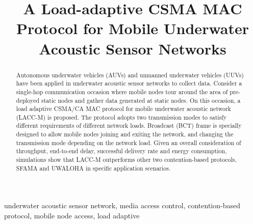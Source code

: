 \documentclass[conference]{IEEEtran}
\begin{document}
\title{A Load-adaptive CSMA MAC Protocol for Mobile Underwater Acoustic Sensor Networks\\
}

\author{
\and
{}
\and
{}
}

\maketitle

\begin{abstract}
Autonomous underwater vehicles (AUVs) and unmanned underwater vehicles (UUVs) have been applied in underwater acoustic sensor networks to collect data. Consider a single-hop communication occasion where mobile nodes tour around the area of pre-deployed static nodes and gather data generated at static nodes. On this occasion, a load adaptive CSMA/CA MAC protocol for mobile underwater acoustic network (LACC-M) is proposed. The protocol adopts two transmission modes to satisfy different requirements of different network loads. Broadcast (BCT) frame is specially designed to allow mobile nodes joining and exiting the network, and changing the transmission mode depending on the network load. Given an overall consideration of throughput, end-to-end delay, successful delivery rate and energy consumption, simulations show that LACC-M outperforms other two contention-based protocols, SFAMA and UWALOHA in specific application scenarios.
\end{abstract}

\begin{IEEEkeywords}
underwater acoustic sensor network, media access control, contention-based protocol, mobile node access, load adaptive
\end{IEEEkeywords}
\end{document}
